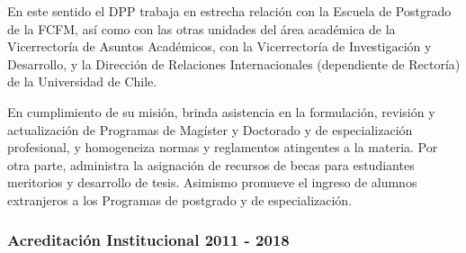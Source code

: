 En este sentido el DPP trabaja en estrecha relación con la Escuela de Postgrado de la FCFM,
así como con las otras unidades del área académica de la Vicerrectoría de Asuntos Académicos,
con la Vicerrectoría de Investigación y Desarrollo, y la Dirección de Relaciones Internacionales
(dependiente de Rectoría) de la Universidad de Chile.

En cumplimiento de su misión, brinda asistencia en la formulación, revisión y actualización
de Programas de Magíster y Doctorado y de especialización profesional, y homogeneiza normas y
reglamentos atingentes a la materia. Por otra parte, administra la asignación de recursos de becas
para estudiantes meritorios y desarrollo de tesis.
Asimismo promueve el ingreso de alumnos extranjeros a los Programas de postgrado y de
especialización.

\subsubsection{Acreditación Institucional 2011 - 2018}




